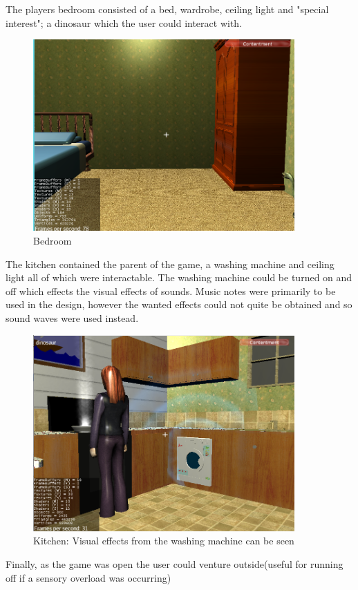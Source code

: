 The players bedroom consisted of a bed, wardrobe, ceiling light and "special interest"; a dinosaur which the user could interact with.

\begin{figure}[H]
\centering
\includegraphics[width=100mm]{images/prototype/bedroom.png}
\caption{Bedroom}
\label{prototype_bedroom}
\end{figure}

The kitchen contained the parent of the game, a washing machine and ceiling light all of which were interactable. The washing machine could be turned on and off which effects the visual effects of sounds. Music notes were primarily to be used in the design, however the wanted effects could not quite be obtained and so sound waves were used instead.  

\begin{figure}[H]
\centering
\includegraphics[width=100mm]{images/prototype/kitchen_washingm.png}
\caption{Kitchen: Visual effects from the washing machine can be seen}
\label{prototype_kitchenwash}
\end{figure}

Finally, as the game was open the user could venture outside(useful for running off if a sensory overload was occurring)

